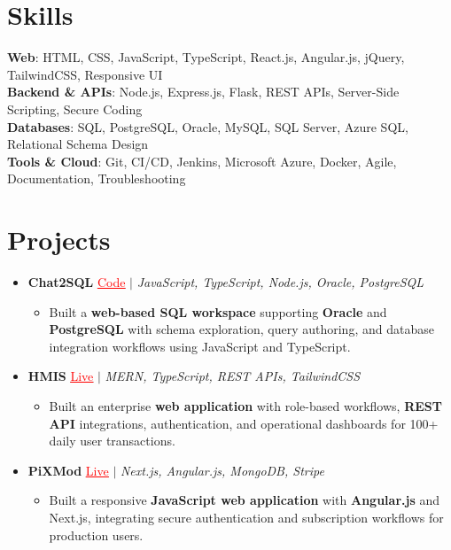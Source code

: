 \documentclass[letterpaper,10pt]{article}
\newcommand{\resumeItem}[1]{\item\small{{#1 \vspace{-2pt}}}}
\newcommand{\resumeProjectHeading}[1]{\item \small #1 \vspace{-2pt}}
\newcommand{\resumeSubHeadingListStart}{\begin{itemize}[leftmargin=0.0in, label={}]}
\newcommand{\resumeSubHeadingListEnd}{\end{itemize}}
\newcommand{\resumeProjItemListStart}{\begin{itemize}[leftmargin=0.15in,label=\textbullet,itemsep=0pt,topsep=0pt,parsep=0pt,partopsep=0pt]}
\newcommand{\resumeProjItemListEnd}{\end{itemize}\vspace{-4pt}}
\begin{document}
\section{Skills}
\begin{itemize}[leftmargin=0.15in, label={}]
\small{\item{
\textbf{Web}: HTML, CSS, JavaScript, TypeScript, React.js, Angular.js, jQuery, TailwindCSS, Responsive UI \\
\textbf{Backend \& APIs}: Node.js, Express.js, Flask, REST APIs, Server-Side Scripting, Secure Coding \\
\textbf{Databases}: SQL, PostgreSQL, Oracle, MySQL, SQL Server, Azure SQL, Relational Schema Design \\
\textbf{Tools \& Cloud}: Git, CI/CD, Jenkins, Microsoft Azure, Docker, Agile, Documentation, Troubleshooting
}}
\end{itemize}
\vspace{-6pt}
\section{Projects}
\resumeSubHeadingListStart
\vspace{-2pt}
\resumeProjectHeading{\textbf{Chat2SQL} {\href{https://github.com/SAHAJ-BHADJA/Chat2SQL}{\textcolor{red}{\underline{Code}}}} $|$ \emph{JavaScript, TypeScript, Node.js, Oracle, PostgreSQL}}
\resumeProjItemListStart
\resumeItem{Built a \textbf{web-based SQL workspace} supporting \textbf{Oracle} and \textbf{PostgreSQL} with schema exploration, query authoring, and database integration workflows using JavaScript and TypeScript.}
\resumeProjItemListEnd
\vspace{3pt}
\resumeProjectHeading{\textbf{HMIS} {\href{https://hims-rouge.vercel.app/}{\textcolor{red}{\underline{Live}}}} $|$ \emph{MERN, TypeScript, REST APIs, TailwindCSS}}
\resumeProjItemListStart
\resumeItem{Built an enterprise \textbf{web application} with role-based workflows, \textbf{REST API} integrations, authentication, and operational dashboards for 100+ daily user transactions.}
\resumeProjItemListEnd
\vspace{3pt}
\resumeProjectHeading{\textbf{PiXMod} {\href{https://pixmod.vercel.app/}{\textcolor{red}{\underline{Live}}}} $|$ \emph{Next.js, Angular.js, MongoDB, Stripe}}
\resumeProjItemListStart
\resumeItem{Built a responsive \textbf{JavaScript web application} with \textbf{Angular.js} and Next.js, integrating secure authentication and subscription workflows for production users.}
\resumeProjItemListEnd
\resumeSubHeadingListEnd
\end{document}
